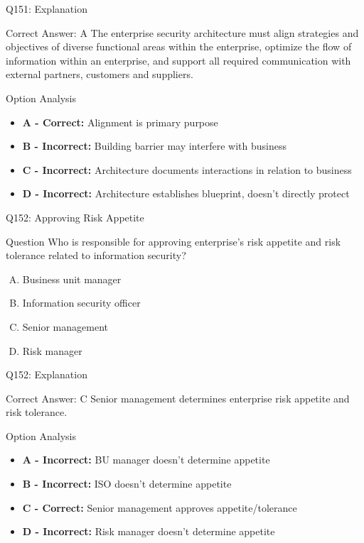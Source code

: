 \documentclass{beamer}
\begin{document}
	\begin{frame}{Q151: Explanation}
		\begin{block}{Correct Answer: A}
			The enterprise security architecture must align strategies and objectives of diverse functional areas within the enterprise, optimize the flow of information within an enterprise, and support all required communication with external partners, customers and suppliers.
		\end{block}
		\begin{block}{Option Analysis}
			\begin{itemize}
				\item \textbf{A - Correct:} Alignment is primary purpose
				\item \textbf{B - Incorrect:} Building barrier may interfere with business
				\item \textbf{C - Incorrect:} Architecture documents interactions in relation to business
				\item \textbf{D - Incorrect:} Architecture establishes blueprint, doesn't directly protect
			\end{itemize}
		\end{block}
	\end{frame}
	
	\begin{frame}{Q152: Approving Risk Appetite}
		\begin{block}{Question}
			Who is responsible for approving enterprise's risk appetite and risk tolerance related to information security?
		\end{block}
		\begin{enumerate}[(A)]
			\item Business unit manager
			\item Information security officer
			\item Senior management
			\item Risk manager
		\end{enumerate}
	\end{frame}
	
	\begin{frame}{Q152: Explanation}
		\begin{block}{Correct Answer: C}
			Senior management determines enterprise risk appetite and risk tolerance.
		\end{block}
		\begin{block}{Option Analysis}
			\begin{itemize}
				\item \textbf{A - Incorrect:} BU manager doesn't determine appetite
				\item \textbf{B - Incorrect:} ISO doesn't determine appetite
				\item \textbf{C - Correct:} Senior management approves appetite/tolerance
				\item \textbf{D - Incorrect:} Risk manager doesn't determine appetite
			\end{itemize}
		\end{block}
	\end{frame}
	
\end{document}
